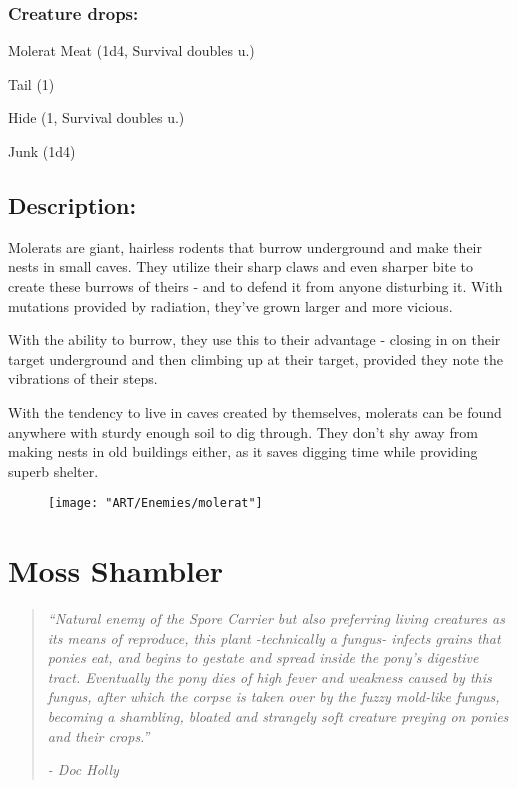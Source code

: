 \documentclass[11pt,a4paper,twocolumn]{book}
\begin{document}
	\subsubsection*{Creature drops:}
	\begin{compactitem}
		\item Molerat Meat (1d4, Survival doubles u.)
		\item Tail (1)
		\item Hide (1, Survival doubles u.)
		\item Junk (1d4)
	\end{compactitem}
	
	\subsection*{Description:}
	
	Molerats are giant, hairless rodents that burrow underground and make their nests in small caves. They utilize their sharp claws and even sharper bite to create these burrows of theirs - and to defend it from anyone disturbing it. With mutations provided by radiation, they've grown larger and more vicious.
	
	With the ability to burrow, they use this to their advantage - closing in on their target underground and then climbing up at their target, provided they note the vibrations of their steps.
	
	With the tendency to live in caves created by themselves, molerats can be found anywhere with sturdy enough soil to dig through. They don't shy away from making nests in old buildings either, as it saves digging time while providing superb shelter.
	
	\begin{figure}[h]
		\centering
		\texttt{[image: "ART/Enemies/molerat"]}
	\end{figure}
	
	\clearpage
	
	\section*{Moss Shambler}
	\begin{quote}
		\emph{``Natural enemy of the Spore Carrier but also preferring living creatures as its means of reproduce, this plant -technically a fungus-  infects grains that ponies eat, and begins to gestate and spread inside the pony's digestive tract. Eventually the pony dies of high fever and weakness caused by this fungus, after which the corpse is taken over by the fuzzy mold-like fungus, becoming a shambling, bloated and strangely soft creature preying on ponies and their crops.''}
		
		\emph{-	Doc Holly}
	\end{quote}
	
\end{document}
